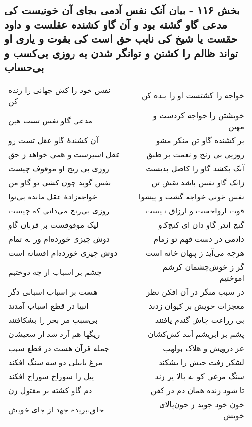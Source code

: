 \begin{center}
\section*{بخش ۱۱۶ - بیان آنک نفس آدمی بجای آن خونیست کی مدعی گاو گشته بود و آن گاو کشنده عقلست و داود حقست یا شیخ  کی نایب حق است کی بقوت و یاری او تواند ظالم را کشتن و توانگر شدن  به روزی بی‌کسب و بی‌حساب}
\label{sec:sh116}
\begin{longtable}{l p{0.5cm} r}
نفس خود را کش جهانی را زنده کن
&&
خواجه را کشتست او را بنده کن
\\
مدعی گاو نفس تست هین
&&
خویشتن را خواجه کردست و مهین
\\
آن کشندهٔ گاو عقل تست رو
&&
بر کشنده گاو تن منکر مشو
\\
عقل اسیرست و همی خواهد ز حق
&&
روزیی بی رنج و نعمت بر طبق
\\
روزی بی رنج او موقوف چیست
&&
آنک بکشد گاو را کاصل بدیست
\\
نفس گوید چون کشی تو گاو من
&&
زانک گاو نفس باشد نقش تن
\\
خواجه‌زادهٔ عقل مانده بی‌نوا
&&
نفس خونی خواجه گشت و پیشوا
\\
روزی بی‌رنج می‌دانی که چیست
&&
قوت ارواحست و ارزاق نبیست
\\
لیک موقوفست بر قربان گاو
&&
گنج اندر گاو دان ای کنج‌کاو
\\
دوش چیزی خورده‌ام ور نه تمام
&&
دادمی در دست فهم تو زمام
\\
دوش چیزی خورده‌ام افسانه است
&&
هرچه می‌آید ز پنهان خانه است
\\
چشم بر اسباب از چه دوختیم
&&
گر ز خوش‌چشمان کرشم آموختیم
\\
هست بر اسباب اسبابی دگر
&&
در سبب منگر در آن افکن نظر
\\
انبیا در قطع اسباب آمدند
&&
معجزات خویش بر کیوان زدند
\\
بی‌سبب مر بحر را بشکافتند
&&
بی زراعت چاش گندم یافتند
\\
ریگها هم آرد شد از سعیشان
&&
پشم بز ابریشم آمد کش‌کشان
\\
جمله قرآن هست در قطع سبب
&&
عز درویش و هلاک بولهب
\\
مرغ بابیلی دو سه سنگ افکند
&&
لشکر زفت حبش را بشکند
\\
پیل را سوراخ سوراخ افکند
&&
سنگ مرغی کو به بالا پر زند
\\
دم گاو کشته بر مقتول زن
&&
تا شود زنده همان دم در کفن
\\
حلق‌ببریده جهد از جای خویش
&&
خون خود جوید ز خون‌پالای خویش
\\

\end{longtable}
\end{center}
